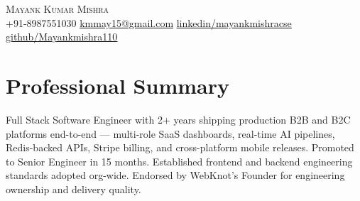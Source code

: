 \documentclass[letterpaper,10pt]{article}
\begin{document}
\begin{center}
    {\fontsize{18}{19}\selectfont \scshape Mayank Kumar Mishra} \\ \vspace{1pt}
    \normalsize
    +91-8987551030 \hspace{0.8cm}
    \href{mailto:kmmay15@gmail.com}{\underline{kmmay15@gmail.com}} \hspace{0.8cm}
    \href{https://linkedin.com/in/mayankmishracse}{\underline{linkedin/mayankmishracse}} \hspace{0.8cm}
    \href{https://github.com/Mayankmishra110}{\underline{github/Mayankmishra110}}
\end{center}
\vspace{-16pt}

\section{Professional Summary}
\vspace{1pt}
\normalsize{Full Stack Software Engineer with 2+ years shipping production B2B and B2C platforms end-to-end --- multi-role SaaS dashboards, real-time AI pipelines, Redis-backed APIs, Stripe billing, and cross-platform mobile releases. Promoted to Senior Engineer in 15 months. Established frontend and backend engineering standards adopted org-wide. Endorsed by WebKnot's Founder for engineering ownership and delivery quality.}

\vspace{-5pt}
\end{document}
